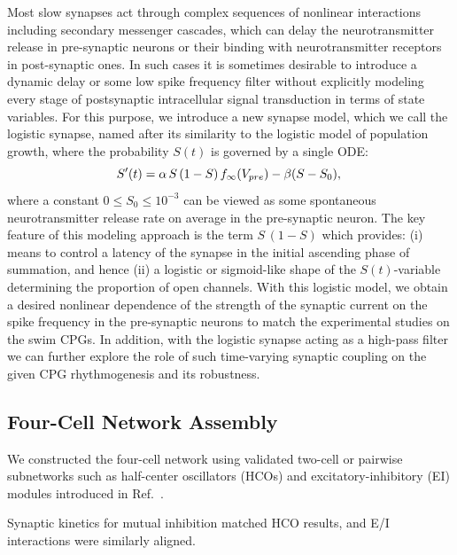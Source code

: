 \documentclass[nofootinbib,aip,amsmath,amssymb,reprint,twocolumn,10pt]{revtex4-2}
\begin{document}
Most slow synapses act through complex sequences of nonlinear interactions including secondary messenger cascades, which can delay the neurotransmitter release in pre-synaptic neurons or their binding with neurotransmitter receptors in post-synaptic ones. In such cases it is sometimes desirable to introduce a dynamic delay or some low spike frequency filter without explicitly modeling every stage of postsynaptic intracellular signal transduction in terms of state variables. For this purpose, we introduce a new synapse model, which we call the logistic synapse, named after its similarity to the logistic model of population growth, where the probability $S(t)$ is governed by a single ODE:  
\begin{equation} \label{sigmoid}
S'(t) = \alpha\, S\,(1-S)\, f_{\infty}(V_{pre}) - \beta (S-S_0), \\
\end{equation} 
where a constant $0 \le S_0 \le 10^{-3}$ can be viewed as some spontaneous neurotransmitter release rate on average in the pre-synaptic neuron. The key feature of this modeling approach is the term $S\,(1-S)$  which provides: (i) means to control a latency of the synapse in the initial ascending phase of summation, and hence (ii) a logistic or sigmoid-like shape of the $S(t)$-variable determining the proportion of open channels. With this logistic model, we obtain a desired nonlinear dependence of the strength of the synaptic current on the spike frequency in the pre-synaptic neurons to match the experimental studies on the swim CPGs. In addition, with the logistic synapse acting as a high-pass filter we can further explore the role of such time-varying synaptic coupling on the given CPG rhythmogenesis and its robustness.




\subsection*{Four-Cell Network Assembly}
We constructed the four-cell network using validated two-cell or pairwise subnetworks 
such as half-center oscillators 
(HCOs) and  excitatory-inhibitory (EI) modules introduced in Ref.~\cite{scully2024pairing}.
 
 
Synaptic kinetics for mutual inhibition matched HCO results, and E/I interactions were similarly aligned.
\end{document}
